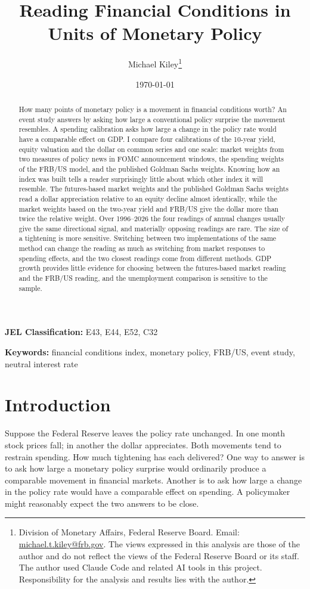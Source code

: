 \documentclass[11pt]{article}
\title{Reading Financial Conditions in Units of Monetary Policy}
\author{Michael Kiley\thanks{Division of Monetary Affairs, Federal Reserve Board. Email: \href{mailto:michael.t.kiley@frb.gov}{michael.t.kiley@frb.gov}. The views expressed in this analysis are those of the author and do not reflect the views of the Federal Reserve Board or its staff. The author used Claude Code and related AI tools in this project. Responsibility for the analysis and results lies with the author.}}
\date{\today}
\begin{document}
\maketitle

\begin{abstract}
How many points of monetary policy is a movement in financial conditions worth? An event study answers by asking how large a conventional policy surprise the movement resembles. A spending calibration asks how large a change in the policy rate would have a comparable effect on GDP. I compare four calibrations of the 10-year yield, equity valuation and the dollar on common series and one scale: market weights from two measures of policy news in FOMC announcement windows, the spending weights of the FRB/US model, and the published Goldman Sachs weights. Knowing how an index was built tells a reader surprisingly little about which other index it will resemble. The futures-based market weights and the published Goldman Sachs weights read a dollar appreciation relative to an equity decline almost identically, while the market weights based on the two-year yield and FRB/US give the dollar more than twice the relative weight. Over 1996--2026 the four readings of annual changes usually give the same directional signal, and materially opposing readings are rare. The size of a tightening is more sensitive. Switching between two implementations of the same method can change the reading as much as switching from market responses to spending effects, and the two closest readings come from different methods. GDP growth provides little evidence for choosing between the futures-based market reading and the FRB/US reading, and the unemployment comparison is sensitive to the sample.
\end{abstract}

\noindent\textbf{JEL Classification:} E43, E44, E52, C32

\noindent\textbf{Keywords:} financial conditions index, monetary policy, FRB/US, event study, neutral interest rate

\pagestyle{plain}

\newpage
{}


\section{Introduction}
\label{sec:intro}
Suppose the Federal Reserve leaves the policy rate unchanged. In one month stock prices fall; in another the dollar appreciates. Both movements tend to restrain spending. How much tightening has each delivered? One way to answer is to ask how large a monetary policy surprise would ordinarily produce a comparable movement in financial markets. Another is to ask how large a change in the policy rate would have a comparable effect on spending. A policymaker might reasonably expect the two answers to be close.
\end{document}
